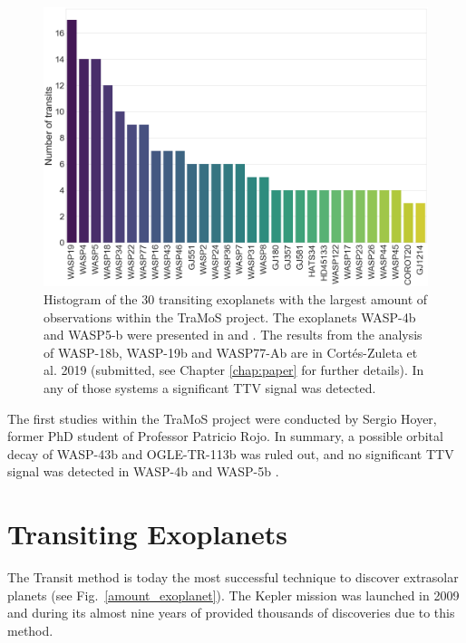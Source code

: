 \begin{figure}
\centering
\includegraphics[width=1.0\columnwidth]{imagenes/tramos.png}
\caption{Histogram of the 30 transiting exoplanets with the largest amount of observations within the TraMoS project. The exoplanets WASP-4b and WASP5-b were presented in \cite{Hoyer2012} and \cite{Hoyer2013}. The results from the analysis of WASP-18b, WASP-19b and WASP77-Ab are in Cortés-Zuleta et al. 2019 (submitted, see Chapter \ref{chap:paper} for further details). In any of those systems a significant TTV signal was detected.}
\label{tramos}
\end{figure}


The first studies within the TraMoS project were conducted by Sergio Hoyer, former PhD student of Professor Patricio Rojo. In summary, a possible orbital decay of WASP-43b \citep{Hoyer2016b} and OGLE-TR-113b \citep{Hoyer2016} was ruled out, and no significant TTV signal was detected in WASP-4b \citep{Hoyer2012} and WASP-5b \citep{Hoyer2013}.

\section{Transiting Exoplanets}
The Transit method is today the most successful technique to discover extrasolar planets (see Fig.~\ref{amount_exoplanet}). The Kepler mission was launched in 2009 and during its almost nine years of provided thousands of discoveries due to this method.

